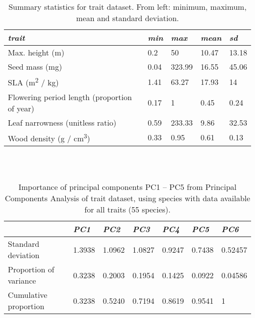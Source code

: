 \begin{table}[ht]
\tiny
\centering
\caption[Summary statistics for trait dataset.]{\small{Summary statistics for trait dataset. From left: minimum, maximum, mean and standard deviation.}} \\
\label{Ch3sup2_T2} \\
{\tabulinesep=1.2mm
\begin{tabu} to 
\hline
\textit{trait} & \textit{min} & \textit{max} & \textit{mean} & \textit{sd} \\
\hline
Max. height (m) & 0.2 & 50 & 10.47 & 13.18 \\
Seed mass (mg) & 0.04 & 323.99 & 16.55 & 45.06 \\
SLA (m\textsuperscript{2} / kg) & 1.41 & 63.27 & 17.93 & 14 \\
Flowering period length \newline(proportion of year) & 0.17 & 1 & 0.45 & 0.24 \\
Leaf narrowness (unitless ratio) & 0.59 & 233.33 & 9.86 & 32.53 \\
Wood density (g / cm\textsuperscript{3}) & 0.33 & 0.95 & 0.61 & 0.13 \\
\hline
\end{tabu}}
\end{table}


\begin{table}[ht]
\tiny
\centering
\caption[Importance of principal components (trait dataset, all traits).]{\small{Importance of principal components PC1 – PC5 from Principal Components Analysis of trait dataset, using species with data available for all traits (55 species).}} \\
\label{Ch3sup2_T3} \\
{\tabulinesep=1.2mm
\begin{tabu} to 
\hline
&                      \textit{PC1}  & \textit{PC2}    & \textit{PC3}    & \textit{PC4}    & \textit{PC5}    & \textit{PC6}            \\ 
\hline
Standard deviation     & 1.3938 & 1.0962 & 1.0827 & 0.9247 & 0.7438 & 0.52457 \\
Proportion of variance & 0.3238 & 0.2003 & 0.1954 & 0.1425 & 0.0922 & 0.04586 \\
Cumulative  proportion & 0.3238 & 0.5240 & 0.7194 & 0.8619 & 0.9541 & 1      \\
\hline
\end{tabu}}
\end{table}

